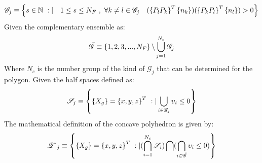      \begin{equation}
               \label{eq.3.135}
               \mathscr{G}_j \equiv\VectorVar{s\in \mathbb{N}\ :|\quad  1\leq s\leq N_F \ , \ \forall k\neq l\in \mathscr{G}_j \quad (\VectorVar{P_lP_k}^T\VectorVar{n_k})(\VectorVar{P_kP_l}^T\VectorVar{n_l})>0 }
        \end{equation}
  Given the complementary ensemble as:
   \begin{equation}
                 \label{eq.3.135a}
                 \bar{\mathscr{G}} \equiv\left\lbrace{1,2,3,...,N_F}\right \rbrace\backslash\bigcup_{j=1}^{N_c}{ \mathscr{G}_j }
    \end{equation}
  Where $N_c$ is the number group of the kind of $ \mathscr{G}_j$ that can be determined for the polygon.
    Given the half spaces defined as:
         \begin{equation}
                   \label{eq.3.136}
                   \mathscr{S}_j \equiv\left\lbrace{\ensuremath\left\lbrace{X_g}\right \rbrace=\ensuremath\left\lbrace{x,y,z}\right \rbrace^T\ :| \bigcup_{i\in \mathscr{G}_j}\upsilon_i\leq 0}\right \rbrace
            \end{equation}
 The mathematical definition of the concave polyhedron is given by:  
 \begin{equation}
         \label{eq.3.137}
         \mathscr{Q^*}_j \equiv\left\lbrace{\ensuremath\left\lbrace{X_g}\right \rbrace=\ensuremath\left\lbrace{x,y,z}\right \rbrace^T\ :| (\bigcap_{i=1}^{N_c}\mathscr{S}_i)\bigcap(\bigcap_{i\in\bar{\mathscr{G}}}\upsilon_i\leq 0)}\right \rbrace
\end{equation} 
